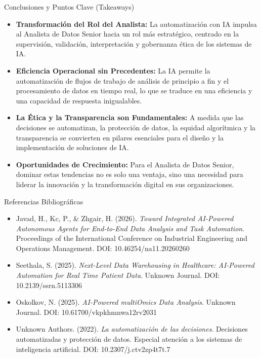 \documentclass[aspectratio=169]{beamer}
\begin{document}
\begin{frame}{Conclusiones y Puntos Clave (Takeaways)}

\begin{itemize}
  \item \textbf{Transformación del Rol del Analista:} La automatización con IA impulsa al Analista de Datos Senior hacia un rol más estratégico, centrado en la supervisión, validación, interpretación y gobernanza ética de los sistemas de IA.
  \item \textbf{Eficiencia Operacional sin Precedentes:} La IA permite la automatización de flujos de trabajo de análisis de principio a fin y el procesamiento de datos en tiempo real, lo que se traduce en una eficiencia y una capacidad de respuesta inigualables.
  \item \textbf{La Ética y la Transparencia son Fundamentales:} A medida que las decisiones se automatizan, la protección de datos, la equidad algorítmica y la transparencia se convierten en pilares esenciales para el diseño y la implementación de soluciones de IA.
  \item \textbf{Oportunidades de Crecimiento:} Para el Analista de Datos Senior, dominar estas tendencias no es solo una ventaja, sino una necesidad para liderar la innovación y la transformación digital en sus organizaciones.
\end{itemize}
\end{frame}

\begin{frame}{Referencias Bibliográficas}


\begin{itemize}
  \item Javad, H., Kc, P., \& Zhgair, H. (2026). \textit{Toward Integrated AI-Powered Autonomous Agents for End-to-End Data Analysis and Task Automation}. Proceedings of the International Conference on Industrial Engineering and Operations Management. DOI: 10.46254/na11.20260260
  \item Seethala, S. (2025). \textit{Next-Level Data Warehousing in Healthcare: AI-Powered Automation for Real Time Patient Data}. Unknown Journal. DOI: 10.2139/ssrn.5113306
  \item Oskolkov, N. (2025). \textit{AI-Powered multiOmics Data Analysis}. Unknown Journal. DOI: 10.61700/vkpkhmnwa12rv2031
  \item Unknown Authors. (2022). \textit{La automatización de las decisiones}. Decisiones automatizadas y protección de datos. Especial atención a los sistemas de inteligencia artificial. DOI: 10.2307/j.ctv2zp4t7t.7
\end{itemize}
\end{frame}
\end{document}
